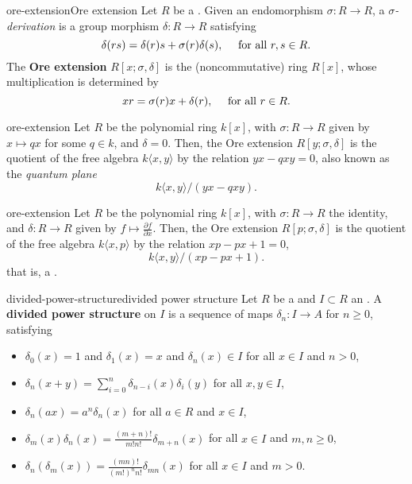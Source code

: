 \begin{topic}{ore-extension}{Ore extension}
    Let $R$ be a . Given an endomorphism $\sigma : R \to R$, a \textit{$\sigma$-derivation} is a group morphism $\delta : R \to R$ satisfying
    \[ \delta(rs) = \delta(r) s + \sigma(r) \delta(s) , \quad \textup { for all } r, s \in R . \]
    The \textbf{Ore extension} $R[x; \sigma, \delta]$ is the (noncommutative) ring $R[x]$, whose multiplication is determined by
    \[ xr = \sigma(r) x + \delta(r), \quad \textup{ for all } r \in R . \]
\end{topic}

\begin{example}{ore-extension}
    Let $R$ be the polynomial ring $k[x]$, with $\sigma : R \to R$ given by $x \mapsto qx$ for some $q \in k$, and $\delta = 0$. Then, the Ore extension $R[y; \sigma, \delta]$ is the quotient of the free algebra $k \langle x, y \rangle$ by the relation $yx - qxy = 0$, also known as the \textit{quantum plane}
    \[ k \langle x, y \rangle / (yx - qxy) . \]
\end{example}

\begin{example}{ore-extension}
    Let $R$ be the polynomial ring $k[x]$, with $\sigma : R \to R$ the identity, and $\delta : R \to R$ given by $f \mapsto \frac{\partial f}{\partial x}$. Then, the Ore extension $R[p; \sigma, \delta]$ is the quotient of the free algebra $k \langle x, p \rangle$ by the relation $xp - px + 1 = 0$,
    \[ k \langle x, y \rangle / (xp - px + 1) . \]
    that is, a .
\end{example}

\begin{topic}{divided-power-structure}{divided power structure}
    Let $R$ be a  and $I \subset R$ an . A \textbf{divided power structure} on $I$ is a sequence of maps $\delta_n : I \to A$ for $n \ge 0$, satisfying
    \begin{itemize}
        \item $\delta_0(x) = 1$ and $\delta_1(x) = x$ and $\delta_n(x) \in I$ for all $x \in I$ and $n > 0$,
        \item $\delta_n(x + y) = \sum_{i = 0}^{n} \delta_{n - i}(x) \delta_i(y)$ for all $x, y \in I$,
        \item $\delta_n(a x) = a^n \delta_n(x)$ for all $a \in R$ and $x \in I$,
        \item $\delta_m(x) \delta_n(x) = \frac{(m + n)!}{m! n!} \delta_{m + n}(x)$ for all $x \in I$ and $m, n \ge 0$,
        \item $\delta_n(\delta_m(x)) = \frac{(mn)!}{(m!)^n n!} \delta_{mn}(x)$ for all $x \in I$ and $m > 0$.
    \end{itemize}
\end{topic}

